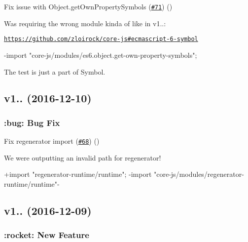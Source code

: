 \begin{DoxyItemize}
\item Fix issue with Object.\+get\+Own\+Property\+Symbols (\href{https://github.com/babel/babel-preset-env/pull/71}{\tt \#71}) (\href{https://github.com/existentialism}{\tt })
\end{DoxyItemize}

Was requiring the wrong module kinda of like in v1..\+:

\href{https://github.com/zloirock/core-js#ecmascript-6-symbol}{\tt https\+://github.\+com/zloirock/core-\/js\#ecmascript-\/6-\/symbol}


\begin{DoxyCode}
-import "core-js/modules/es6.object.get-own-property-symbols";
\end{DoxyCode}


The test is just a part of {\ttfamily Symbol}.

\subsection*{v1.. (2016-\/12-\/10)}

\subsubsection*{\+:bug\+: Bug Fix}


\begin{DoxyItemize}
\item Fix regenerator import (\href{https://github.com/babel/babel-preset-env/pull/68}{\tt \#68}) (\href{https://github.com/hzoo}{\tt })
\end{DoxyItemize}

We were outputting an invalid path for {\ttfamily regenerator}!


\begin{DoxyCode}
+import "regenerator-runtime/runtime";
-import "core-js/modules/regenerator-runtime/runtime"-
\end{DoxyCode}


\subsection*{v1.. (2016-\/12-\/09)}

\subsubsection*{\+:rocket\+: New Feature}


